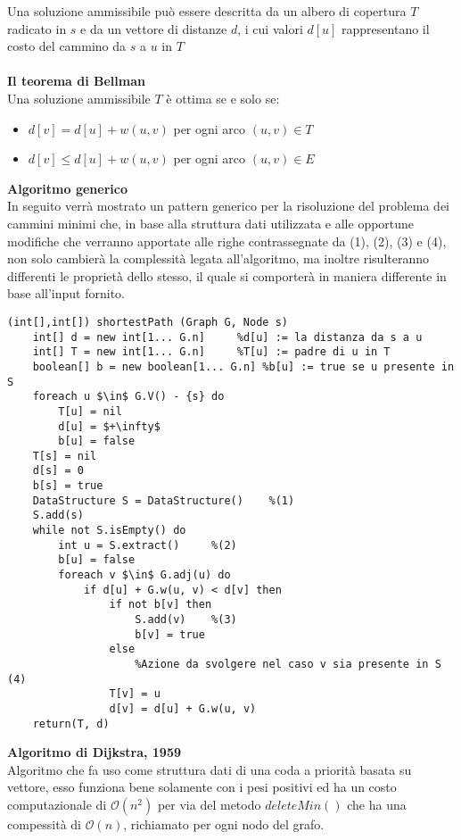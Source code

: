 \documentclass[../cheatSheetAlgoritmi.tex]{subfiles}
\begin{document}
Una soluzione ammissibile può essere descritta da un albero di copertura $T$ radicato in $s$ e da un vettore di distanze $d$, i cui valori $d[u]$ rappresentano il costo del cammino da $s$ a $u$ in $T$
\\\\
\textbf{Il teorema di Bellman} \\
Una soluzione ammissibile $T$ è ottima se e solo se:
\begin{itemize}
	\item $d[v] = d[u] +w(u, v)$ per ogni arco $(u, v) \in T$
	\item $d[v] \leq d[u] +w(u, v)$ per ogni arco $(u, v) \in E$
\end{itemize}
\textbf{Algoritmo generico} \\
In seguito verrà mostrato un pattern generico per la risoluzione del problema dei cammini minimi che, in base alla struttura dati utilizzata e alle opportune modifiche che verranno apportate alle righe contrassegnate da (1), (2), (3) e (4), non solo cambierà la complessità legata all'algoritmo, ma inoltre risulteranno differenti le proprietà dello stesso, il quale si comporterà in maniera differente in base all'input fornito.
\begin{lstlisting}[caption=Algoritmo generico per il problema dei cammini minimi a sorgente singola]
(int[],int[]) shortestPath (Graph G, Node s)
	int[] d = new int[1... G.n]		%d[u] := la distanza da s a u 
	int[] T = new int[1... G.n]		%T[u] := padre di u in T
	boolean[] b = new boolean[1... G.n]	%b[u] := true se u presente in S 
	foreach u $\in$ G.V() - {s} do
		T[u] = nil
		d[u] = $+\infty$
		b[u] = false
	T[s] = nil
	d[s] = 0
	b[s] = true
	DataStructure S = DataStructure()	 %(1)
	S.add(s)
	while not S.isEmpty() do 
		int u = S.extract() 	%(2)
		b[u] = false
		foreach v $\in$ G.adj(u) do
			if d[u] + G.w(u, v) < d[v] then 
				if not b[v] then
					S.add(v)	%(3)
					b[v] = true
				else
					%Azione da svolgere nel caso v sia presente in S (4)
				T[v] = u 
				d[v] = d[u] + G.w(u, v)
	return(T, d)
\end{lstlisting}
\textbf{Algoritmo di Dijkstra, 1959} \\
Algoritmo che fa uso come struttura dati di una coda a priorità basata su vettore, esso funziona bene solamente con i pesi positivi ed ha un costo computazionale di $\mathcal{O}(n^2)$ per via del metodo $deleteMin()$ che ha una compessità di $\mathcal{O}(n)$, richiamato per ogni nodo del grafo.
\end{document}
